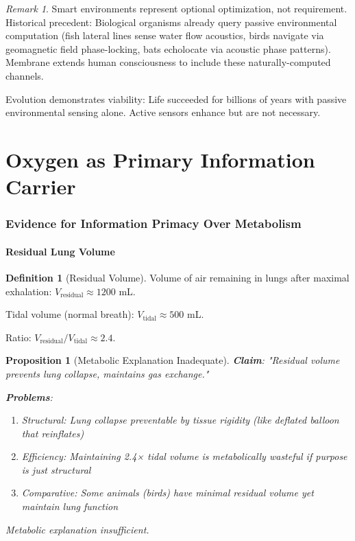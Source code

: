 \documentclass[11pt,a4paper]{article}
\newtheorem{proposition}[theorem]{Proposition}
\theoremstyle{definition}
\newtheorem{definition}[theorem]{Definition}
\theoremstyle{remark}
\newtheorem{remark}[theorem]{Remark}
\begin{document}
\begin{remark}
Smart environments represent optional optimization, not requirement. Historical precedent: Biological organisms already query passive environmental computation (fish lateral lines sense water flow acoustics, birds navigate via geomagnetic field phase-locking, bats echolocate via acoustic phase patterns). Membrane extends human consciousness to include these naturally-computed channels.

Evolution demonstrates viability: Life succeeded for billions of years with passive environmental sensing alone. Active sensors enhance but are not necessary.
\end{remark}

\part{Oxygen as Primary Information Carrier}

\section{Evidence for Information Primacy Over Metabolism}

\subsection{Residual Lung Volume}

\begin{definition}[Residual Volume]
Volume of air remaining in lungs after maximal exhalation: $V_{\text{residual}} \approx 1200$ mL.

Tidal volume (normal breath): $V_{\text{tidal}} \approx 500$ mL.

Ratio: $V_{\text{residual}}/V_{\text{tidal}} \approx 2.4$.
\end{definition}

\begin{proposition}[Metabolic Explanation Inadequate]
\textbf{Claim}: "Residual volume prevents lung collapse, maintains gas exchange."

\textbf{Problems}:
\begin{enumerate}
\item Structural: Lung collapse preventable by tissue rigidity (like deflated balloon that reinflates)
\item Efficiency: Maintaining 2.4× tidal volume is metabolically wasteful if purpose is just structural
\item Comparative: Some animals (birds) have minimal residual volume yet maintain lung function
\end{enumerate}

Metabolic explanation insufficient.
\end{proposition}
\end{document}
